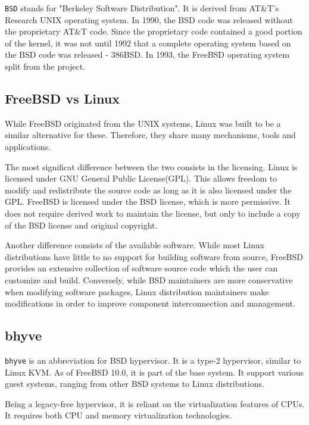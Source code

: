 
\texttt{BSD} stands for "Berkeley Software Distribution". It is derived from AT\&T's Research UNIX operating system. In 1990, the BSD code was released without the proprietary AT\&T code.
Since the proprietary code contained a good portion of the kernel, it was not until 1992 that a complete operating system based on the BSD code was released - 386BSD. In 1993, the FreeBSD operating system split from the project\cite{bsd}. 

\subsection{FreeBSD vs Linux}
\label{subsec:bsdlinux}

While FreeBSD originated from the UNIX systems, Linux was built to be a similar alternative for these. Therefore, they share many mechanisms, tools and applications.

The most significat difference between the two consists in the licensing. Linux is licensed under GNU General Public License(GPL)\cite{gnu}. This allows freedom to modify and redistribute the source code as long as it is also licensed under the GPL. FreeBSD is licensed under the BSD license, which is more permissive. It does not require derived work to maintain the license, but only to include a copy of the BSD license and original copyright\cite{bsd-license}.

Another difference consists of the available software. While most Linux distributions have little to no support for building software from source, FreeBSD provides an extensive collection of software source code which the user can customize and build. Conversely, while BSD maintainers are more conservative when modifying software packages, Linux distribution maintainers make modifications in order to improve component interconnection and management\cite{comp-bsd-linux}.

\subsection{bhyve}
\label{subsec:bhyve}

\texttt{bhyve} is an abbreviation for BSD hypervisor. It is a type-2 hypervisor, similar to Linux KVM. As of FreeBSD 10.0, it is part of the base system. It support various guest systems, ranging from other BSD systems to Linux distributions\cite{intr-bhyve}.

Being a legacy-free hypervisor, it is reliant on the virtualization features of CPUs. It requires both CPU and memory virtualization technologies.

